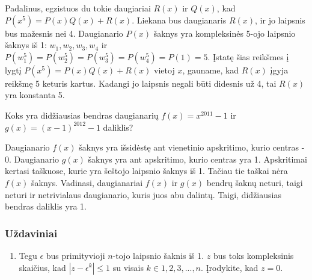 \begin{sprendimas}
Padalinus, egzistuos du tokie daugiariai $R(x)$ ir $Q(x)$, kad $P(x^5)=P(x)Q(x)+R(x)$. Liekana bus daugianaris $R(x)$, ir jo laipsnis bus mažesnis nei 4. Daugianario $P(x)$ šaknys yra kompleksinės 5-ojo laipsnio šaknys iš 1: $w_1, w_2, w_3,w_4$ ir $P(w_1^5)=P(w_2^5)=P(w_3^5)=P(w_4^5)=P(1)=5$. Įstatę šias reikšmes į lygtį $P(x^5)=P(x)Q(x)+R(x)$ vietoj $x$, gauname, kad $R(x)$ įgyja reikšmę 5 keturis kartus. Kadangi jo laipsnis negali būti didesnis už 4, tai $R(x)$ yra konstanta 5. 
\end{sprendimas}

\begin{pavnr}
Koks yra didžiausias bendras daugianarių $f(x)=x^{2011}-1$ ir $g(x)=(x-1)^{2012}-1$ daliklis? 
\end{pavnr}

\begin{sprendimas}
Daugianario $f(x)$ šaknys yra išsidėstę ant vienetinio apskritimo, kurio centras - 0. Daugianario $g(x)$ šaknys yra ant apskritimo, kurio centras yra 1. Apskritimai kertasi taškuose, kurie yra šeštojo laipsnio šaknys iš 1. Tačiau tie taškai nėra $f(x)$ šaknys. Vadinasi, daugianariai $f(x)$ ir $g(x)$ bendrų šaknų neturi, taigi neturi ir netrivialaus daugianario, kuris juos abu dalintų. Taigi, didžiausias bendras daliklis yra 1. 
\end{sprendimas}

\subsubsection{Uždaviniai}
\begin{enumerate}
\item Tegu $\epsilon$ bus primityvioji $n$-tojo laipsnio šaknis iš 1. $z$ bus toks kompleksinis skaičius, kad $|z-\epsilon^k|\leq 1$ su visais $k\in{1,2,3,...,n}$. Įrodykite, kad $z=0$.
\end{enumerate}


